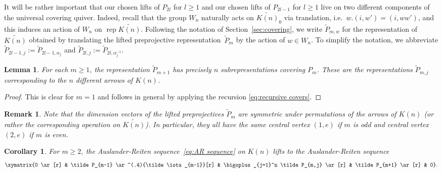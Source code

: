 \documentclass{amsart}
\newtheorem{corollary}[theorem]{Corollary}
\newtheorem{lemma}[theorem]{Lemma}
\newtheorem{remark}[theorem]{Remark}
\numberwithin{equation}{section}
\newcommand{\rep}{\operatorname{rep}}
\begin{document}
It will be rather important that our chosen lifts of $P_{2l}$ for $l\ge1$ and our chosen lifts of $P_{2l-1}$ for $l\ge1$ live on two different components of the universal covering quiver.
Indeed, recall that the group $W_n$ naturally acts on $\widetilde{K(n)}_0$ via translation, i.e.~$w.(i,w')=(i,ww')$, and this induces an action of $W_n$ on $\rep\widetilde{K(n)}$.
Following the notation of Section~\ref{sec:covering}, we write $\tilde P_{m,w}$ for the representation of $\widetilde{K(n)}$ obtained by translating the lifted preprojective representation~$\tilde P_m$ by the action of $w\in W_n$.
To simplify the notation, we abbreviate $\tilde P_{2l-1,j}:=\tilde P_{2l-1,\alpha_j}$ and $\tilde P_{2l,j}:=\tilde P_{2l,\alpha_j^{-1}}$.
\begin{lemma}
  \label{le:shifted subreps}
  For each $m\ge1$, the representation $\tilde P_{m+1}$ has precisely $n$ subrepresentations covering $P_m$.
  These are the representations $\tilde P_{m,j}$ corresponding to the $n$ different arrows of $K(n)$. 
\end{lemma}
\begin{proof}
  This is clear for $m=1$ and follows in general by applying the recursion \eqref{eq:recursive covers}.
\end{proof}
\begin{remark}
  Note that the dimension vectors of the lifted preprojectives $\tilde P_m$ are symmetric under permutations of the arrows of $K(n)$ (or rather the corresponding operation on $\widetilde{K(n)}$).
  In particular, they all have the same central vertex $(1,e)$ if $m$ is odd and central vertex $(2,e)$ if $m$ is even.
\end{remark}

\begin{corollary}
  \label{cor:AR lift}
  For $m\ge2$, the Auslander-Reiten sequence~\eqref{eq:AR sequence} on $K(n)$ lifts to the Auslander-Reiten sequence
  \begin{equation}
    \label{eq:lifted AR sequence}
    \xymatrix{0 \ar[r] & \tilde P_{m-1} \ar^(.4){\tilde\iota_{m-1}}[r] & \bigoplus_{j=1}^n \tilde P_{m,j} \ar[r] & \tilde P_{m+1} \ar[r] & 0}.
  \end{equation}
\end{corollary} 
\end{document}
